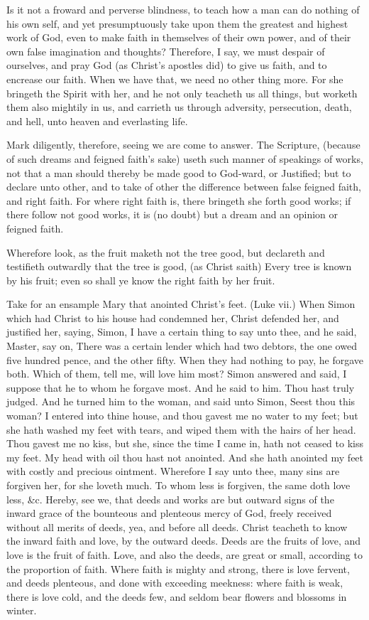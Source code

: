 \documentclass{custom}
\begin{document}
Is it not a froward and perverse blindness, to teach how 
a man can do nothing of his own self, and yet
presumptuously take upon them the greatest and highest work of 
God, even to make faith in themselves of their own power, 
and of their own false imagination and thoughts?
Therefore, I say, we must despair of ourselves, and pray God 
(as Christ's apostles did) to give us faith, and to encrease 
our faith. When we have that, we need no other thing 
more. For she bringeth the Spirit with her, and he not 
only teacheth us all things, but worketh them also mightily 
in us, and carrieth us through adversity, persecution, death, 
and hell, unto heaven and everlasting life. 


Mark diligently, therefore, seeing we are come to
answer. The Scripture, (because of such dreams and feigned 
faith's sake) useth such manner of speakings of works, 
not that a man should thereby be made good to God-ward, 
or Justified; but to declare unto other, and to take of 
other the difference between false feigned faith, and right 
faith. For where right faith is, there bringeth she forth 
good works; if there follow not good works, it is (no 
doubt) but a dream and an opinion or feigned faith. 

Wherefore look, as the fruit maketh not the tree good, 
but declareth and testifieth outwardly that the tree is good, 
(as Christ saith) Every tree is known by his fruit; even 
so shall ye know the right faith by her fruit. 

Take for an ensample Mary that anointed Christ's feet. 
(Luke vii.) When Simon which had Christ to his house 
had condemned her, Christ defended her, and justified her, 
saying, Simon, I have a certain thing to say unto thee, and 
he said, Master, say on, There was a certain lender which 
had two debtors, the one owed five hundred pence, and 
the other fifty. When they had nothing to pay, he forgave 
both. Which of them, tell me, will love him most?
Simon answered and said, I suppose that he to whom he
forgave most. And he said to him. Thou hast truly judged. 
And he turned him to the woman, and said unto Simon, 
Seest thou this woman? I entered into thine house, and 
thou gavest me no water to my feet; but she hath washed 
my feet with tears, and wiped them with the hairs of her 
head. Thou gavest me no kiss, but she, since the time I 
came in, hath not ceased to kiss my feet. My head with
oil thou hast not anointed. And she hath anointed my feet
with costly and precious ointment. Wherefore I say unto 
thee, many sins are forgiven her, for she loveth much. To 
whom less is forgiven, the same doth love less, \&c. 
Hereby, see we, that deeds and works are but outward 
signs of the inward grace of the bounteous and plenteous 
mercy of God, freely received without all merits of deeds, 
yea, and before all deeds. Christ teacheth to know the 
inward faith and love, by the outward deeds. Deeds are the 
fruits of love, and love is the fruit of faith. Love, and 
also the deeds, are great or small, according to the
proportion of faith. Where faith is mighty and strong, there 
is love fervent, and deeds plenteous, and done with
exceeding meekness: where faith is weak, there is love cold, 
and the deeds few, and seldom bear flowers and blossoms 
in winter. 
\end{document}
